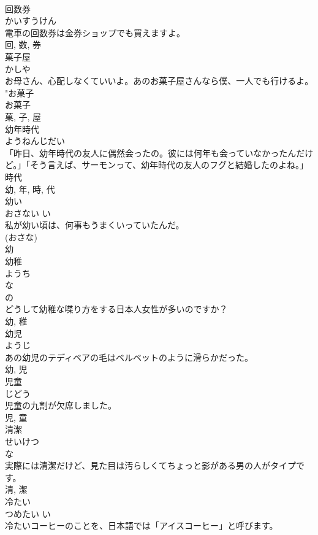 \documentclass[8pt]{extreport}
\begin{document}
\begin{CJK}{UTF8}{min}
\\	回数券	
\\	かいすうけん	
\\	電車の回数券は金券ショップでも買えますよ。	
\\	回, 数, 券	
\\	菓子屋	
\\	かしや	
\\	お母さん、心配しなくていいよ。あのお菓子屋さんなら僕、一人でも行けるよ。	
\\	"お菓子 
\\	お菓子 
\\	菓, 子, 屋	
\\	幼年時代	
\\	ようねんじだい	
\\	「昨日、幼年時代の友人に偶然会ったの。彼には何年も会っていなかったんだけど。」「そう言えば、サーモンって、幼年時代の友人のフグと結婚したのよね。」	
\\	時代 
\\	幼, 年, 時, 代	
\\	幼い	
\\	おさない	い 
\\	私が幼い頃は、何事もうまくいっていたんだ。	
\\	(おさな) 
\\	幼	
\\	幼稚	
\\	ようち	
\\	な 
\\	の 
\\	どうして幼稚な喋り方をする日本人女性が多いのですか？	
\\	幼, 稚	
\\	幼児	
\\	ようじ	
\\	あの幼児のテディベアの毛はベルベットのように滑らかだった。	
\\	幼, 児	
\\	児童	
\\	じどう	
\\	児童の九割が欠席しました。	
\\	児, 童	
\\	清潔	
\\	せいけつ	
\\	な 
\\	実際には清潔だけど、見た目は汚らしくてちょっと影がある男の人がタイプです。	
\\	清, 潔	
\\	冷たい	
\\	つめたい	い 
\\	冷たいコーヒーのことを、日本語では「アイスコーヒー」と呼びます。	

\end{CJK}
\end{document}
